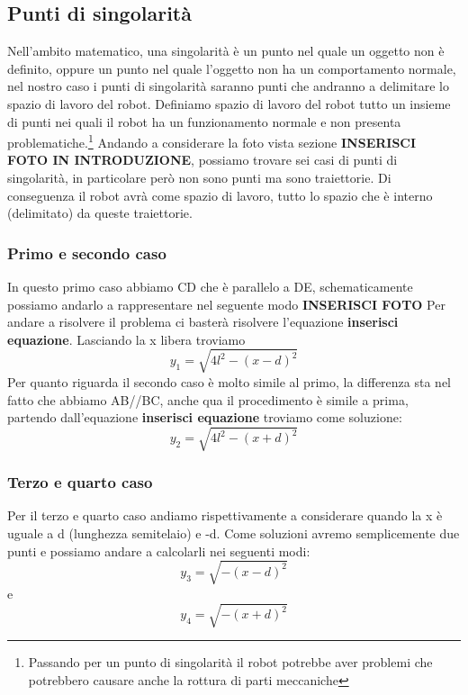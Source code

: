 \subsection{Punti di singolarità}
Nell'ambito matematico, una singolarità è un punto nel quale un oggetto non è definito, oppure un punto nel quale l'oggetto non ha un comportamento normale, nel nostro caso i punti di singolarità saranno punti che andranno a delimitare lo spazio di lavoro del robot. Definiamo spazio di lavoro del robot tutto un insieme di punti nei quali il robot ha un funzionamento normale e non presenta problematiche.\footnote{Passando per un punto di singolarità il robot potrebbe aver problemi che potrebbero causare anche la rottura di parti meccaniche} Andando a considerare la foto vista sezione \textbf{INSERISCI FOTO IN INTRODUZIONE}, possiamo trovare sei casi di punti di singolarità, in particolare però non sono punti ma sono traiettorie. Di conseguenza il robot avrà come spazio di lavoro, tutto lo spazio che è interno (delimitato) da queste traiettorie.
\subsubsection{Primo e secondo caso}
In questo primo caso abbiamo CD che è parallelo a DE, schematicamente possiamo andarlo a rappresentare nel seguente modo \textbf{INSERISCI FOTO}
Per andare a risolvere il problema ci basterà risolvere l'equazione \textbf{inserisci equazione}. Lasciando la x libera troviamo 
\begin{equation}
    y_1 = \sqrt{4l^2-(x-d)^2}
\end{equation}
Per quanto riguarda il secondo caso è molto simile al primo, la differenza sta nel fatto che abbiamo AB//BC, anche qua il procedimento è simile a prima, partendo dall'equazione \textbf{inserisci equazione} troviamo come soluzione:
\begin{equation}
    y_2 = \sqrt{4l^2-(x+d)^2}
\end{equation}
\subsubsection{Terzo e quarto caso}
Per il terzo e quarto caso andiamo rispettivamente a considerare quando la x è uguale a d (lunghezza semitelaio) e -d. Come soluzioni avremo semplicemente due punti e possiamo andare a calcolarli nei seguenti modi:
\begin{equation}
    y_3 = \sqrt{-(x-d)^2}
\end{equation}
e
\begin{equation}
    y_4 = \sqrt{-(x+d)^2}
\end{equation}
